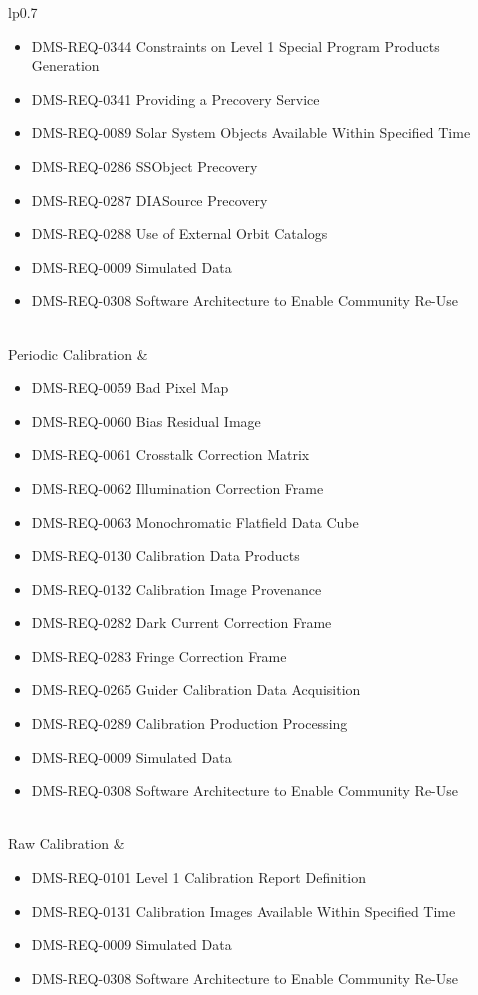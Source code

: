 \begin{xtabular}{lp{0.7\textwidth}}
\begin{itemize}
\item DMS-REQ-0344 Constraints on Level 1 Special Program Products Generation
\item DMS-REQ-0341 Providing a Precovery Service
\item DMS-REQ-0089 Solar System Objects Available Within Specified Time
\item DMS-REQ-0286 SSObject Precovery
\item DMS-REQ-0287 DIASource Precovery
\item DMS-REQ-0288 Use of External Orbit Catalogs
\item DMS-REQ-0009 Simulated Data
\item DMS-REQ-0308 Software Architecture to Enable Community Re-Use
\end{itemize} \\ \hline
Periodic Calibration &
\begin{itemize}
\item DMS-REQ-0059 Bad Pixel Map
\item DMS-REQ-0060 Bias Residual Image
\item DMS-REQ-0061 Crosstalk Correction Matrix
\item DMS-REQ-0062 Illumination Correction Frame
\item DMS-REQ-0063 Monochromatic Flatfield Data Cube
\item DMS-REQ-0130 Calibration Data Products
\item DMS-REQ-0132 Calibration Image Provenance
\item DMS-REQ-0282 Dark Current Correction Frame
\item DMS-REQ-0283 Fringe Correction Frame
\item DMS-REQ-0265 Guider Calibration Data Acquisition
\item DMS-REQ-0289 Calibration Production Processing
\item DMS-REQ-0009 Simulated Data
\item DMS-REQ-0308 Software Architecture to Enable Community Re-Use
\end{itemize} \\ \hline
Raw Calibration &
\begin{itemize}
\item DMS-REQ-0101 Level 1 Calibration Report Definition
\item DMS-REQ-0131 Calibration Images Available Within Specified Time
\item DMS-REQ-0009 Simulated Data
\item DMS-REQ-0308 Software Architecture to Enable Community Re-Use

\end{itemize}
\end{xtabular}
